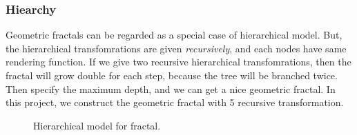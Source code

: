 \documentclass[a4paper]{article}
\begin{document}
\subsubsection{Hiearchy}
Geometric fractals can be regarded as a special case of hierarchical model.
But, the hierarchical transfomrations are given \textit{recursively}, and each nodes have same rendering function.
If we give two recursive hierarchical transfomrations, then the fractal will grow double for each step, because the tree will be branched twice.
Then specify the maximum depth, and we can get a nice geometric fractal.
In this project, we construct the geometric fractal with 5 recursive transformation.
\begin{figure}[H]
\centering
{}
\caption[1]{Hierarchical model for fractal.}
\end{figure}
\end{document}
